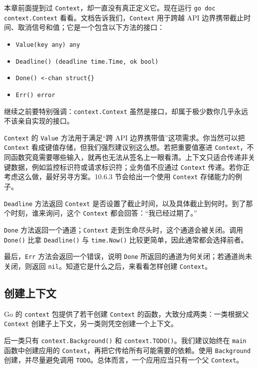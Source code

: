 本章前面提到过 \texttt{Context}，却一直没有真正定义它。现在运行 \texttt{go doc context.Context} 看看。文档告诉我们，\texttt{Context} 用于跨越 API 边界携带截止时间、取消信号和值；它是一个包含以下方法的接口：

\begin{itemize}
  \item \texttt{Value(key any) any}
  \item \texttt{Deadline() (deadline time.Time, ok bool)}
  \item \texttt{Done() <-chan struct\{\}}
  \item \texttt{Err() error}
\end{itemize}

继续之前要特别强调：\texttt{context.Context} 虽然是接口，却属于极少数你几乎永远不该亲自实现的接口。

\texttt{Context} 的 \texttt{Value} 方法用于满足“跨 API 边界携带值”这项需求。你当然可以把 \texttt{Context} 看成键值存储，但我们强烈建议别这么想。若把重要值塞进 \texttt{Context}，不同函数究竟需要哪些输入，就再也无法从签名上一眼看清。上下文只适合传递非关键数据，例如监控标识符或请求标识符；业务值不应通过 \texttt{Context} 传递。若你正考虑这么做，最好另寻方案。10.6.3 节会给出一个使用 \texttt{Context} 存储能力的例子。

\texttt{Deadline} 方法返回 \texttt{Context} 是否设置了截止时间，以及具体截止到何时。到了那个时刻，谁来询问，这个 \texttt{Context} 都会回答：“我已经过期了。”

\texttt{Done} 方法返回一个通道；\texttt{Context} 走到生命尽头时，这个通道会被关闭。调用 \texttt{Done()} 比拿 \texttt{Deadline()} 与 \texttt{time.Now()} 比较更简单，因此通常都会选择前者。

最后，\texttt{Err} 方法会返回一个错误，说明 \texttt{Done} 所返回的通道为何关闭；若通道尚未关闭，则返回 \texttt{nil}。知道它是什么之后，来看看怎样创建 \texttt{Context}。

\subsection{创建上下文}

Go 的 \texttt{context} 包提供了若干创建 \texttt{Context} 的函数，大致分成两类：一类根据父 \texttt{Context} 创建子上下文，另一类则凭空创建一个上下文。

后一类只有 \texttt{context.Background()} 和 \texttt{context.TODO()}。我们建议始终在 \texttt{main} 函数中创建应用的 \texttt{Context}，再把它传给所有可能需要的依赖。使用 \texttt{Background} 创建，并尽量避免调用 \texttt{TODO}。总体而言，一个应用应当只有一个父 \texttt{Context}。

